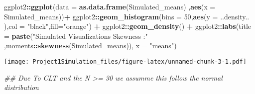 \documentclass[
]{article}
\newenvironment{Shaded}{\begin{snugshade}}{\end{snugshade}}
\newcommand{\CommentTok}[1]{\textcolor[rgb]{0.56,0.35,0.01}{\textit{#1}}}
\newcommand{\DataTypeTok}[1]{\textcolor[rgb]{0.13,0.29,0.53}{#1}}
\newcommand{\DecValTok}[1]{\textcolor[rgb]{0.00,0.00,0.81}{#1}}
\newcommand{\KeywordTok}[1]{\textcolor[rgb]{0.13,0.29,0.53}{\textbf{#1}}}
\newcommand{\NormalTok}[1]{#1}
\newcommand{\OperatorTok}[1]{\textcolor[rgb]{0.81,0.36,0.00}{\textbf{#1}}}
\newcommand{\StringTok}[1]{\textcolor[rgb]{0.31,0.60,0.02}{#1}}
\begin{document}
\begin{Shaded}
\begin{Highlighting}[]
\NormalTok{ggplot2}\OperatorTok{::}\KeywordTok{ggplot}\NormalTok{(}\DataTypeTok{data =} \KeywordTok{as.data.frame}\NormalTok{(Simulated\_means) ,}\KeywordTok{aes}\NormalTok{(}\DataTypeTok{x =}\NormalTok{ Simulated\_means))}\OperatorTok{+}
\StringTok{        }\NormalTok{ggplot2}\OperatorTok{::}\KeywordTok{geom\_histogram}\NormalTok{(}\DataTypeTok{bins =} \DecValTok{50}\NormalTok{,}\KeywordTok{aes}\NormalTok{(}\DataTypeTok{y =}\NormalTok{ ..density.. ),}\DataTypeTok{col =} \StringTok{"black"}\NormalTok{,}\DataTypeTok{fill=}\StringTok{"orange"}\NormalTok{) }\OperatorTok{+}
\StringTok{        }\NormalTok{ggplot2}\OperatorTok{::}\KeywordTok{geom\_density}\NormalTok{() }\OperatorTok{+}
\StringTok{        }\NormalTok{ggplot2}\OperatorTok{::}\KeywordTok{labs}\NormalTok{(}\DataTypeTok{title =} \KeywordTok{paste}\NormalTok{(}\StringTok{"Simulated Visualizations Skewness :"}\NormalTok{ ,moments}\OperatorTok{::}\KeywordTok{skewness}\NormalTok{(Simulated\_means)), }\DataTypeTok{x =} \StringTok{"means"}\NormalTok{) }
\end{Highlighting}
\end{Shaded}

\texttt{[image: Project1Simulation\_files/figure-latex/unnamed-chunk-3-1.pdf]}

\begin{Shaded}
\begin{Highlighting}[]
\CommentTok{\#\# Due To CLT and the N \textgreater{}= 30 we assumme this follow the normal distribution}
\end{Highlighting}
\end{Shaded}
\end{document}
